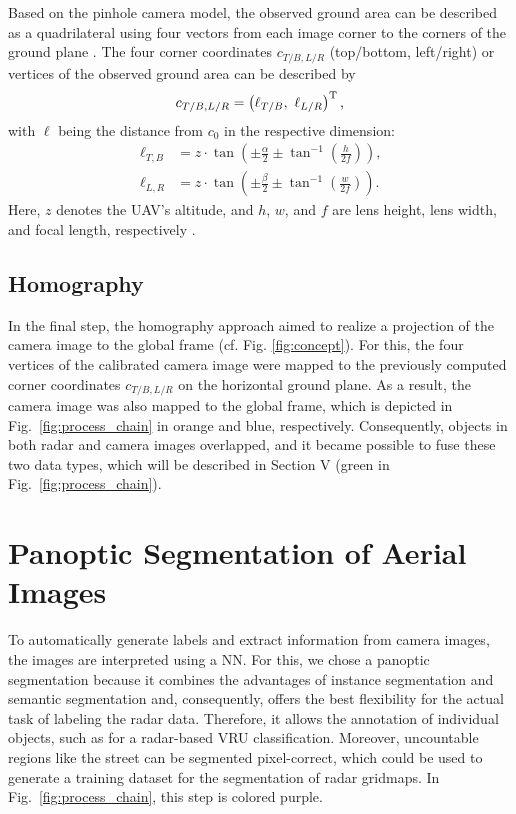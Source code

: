 \documentclass[conference]{IEEEtran}
\begin{document}
Based on the pinhole camera model, the observed ground area can be described as a quadrilateral using four vectors from each image corner to the corners of the ground plane \cite{b13}.
The four corner coordinates $c_{T/B, L/R}$ (top/bottom, left/right) or vertices of the observed ground area can be described by 
\begin{equation}
    c_{T/B,L/R} = \left(\ell_{T/B}, \ \ell_{L/R}\right)^\text{T}\text{,} \\
 \end{equation}
with $\ell$ being the distance from $c_0$ in the respective dimension:
\begin{equation}
    \begin{split}
        \ell_{T,B} &= z\cdot \tan\left(\pm\frac{\alpha}{2} \pm \tan^{-1}\left(\frac{h}{2f}\right)\right)\text{,} \\
        \ell_{L,R} &= z\cdot \tan\left(\pm\frac{\beta}{2} \pm \tan^{-1}\left(\frac{w}{2f}\right)\right)\text{.}
    \end{split}
\end{equation}
Here, $z$ denotes the UAV's altitude, and $h$, $w$, and $f$ are lens height, lens width, and focal length, respectively \cite{b13}.

%
%
\subsection{Homography}

In the final step, the homography approach aimed to realize a projection of the camera image to the global frame (cf. Fig. \ref{fig:concept})\cite{b14}\cite{b15}.
For this, the four vertices of the calibrated camera image were mapped to the previously computed corner coordinates $c_{T/B, L/R}$ on the horizontal ground plane.
As a result, the camera image was also mapped to the global frame, which is depicted in Fig.~\ref{fig:process_chain} in orange and blue, respectively.
Consequently, objects in both radar and camera images overlapped, and it became possible to fuse these two data types, which will be described in Section V (green in Fig.~\ref{fig:process_chain}).

%
%
\section{Panoptic Segmentation of Aerial Images}

To automatically generate labels and extract information from camera images, the  images are interpreted using a NN.
For this, we chose a panoptic segmentation because it combines the advantages of instance segmentation and semantic segmentation and, consequently, offers the best flexibility for the actual task of labeling the radar data.
Therefore, it allows the annotation of individual objects, such as for a radar-based VRU classification.
Moreover, uncountable regions like the street can be segmented pixel-correct, which could be used to generate a training dataset for the segmentation of radar gridmaps.
In Fig.~\ref{fig:process_chain}, this step is colored purple.
\end{document}
